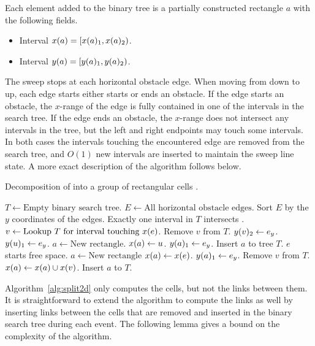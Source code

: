 \documentclass[english,gradu]{tktltiki2018}
\begin{document}
Each element added to the binary tree is a partially constructed rectangle $a$ with the following fields.
\begin{itemize}
\item Interval $x(a)=\left [ x(a)_{1} , x(a)_{2} \right )$.
\item Interval $y(a)=\left [ y(a)_{1} , y(a)_{2} \right )$.
\end{itemize}

The sweep stops at each horizontal obstacle edge.
When moving from down to up, each edge starts either starts or ends an obstacle.
If the edge starts an obstacle, the $x$-range of the edge is fully contained in one of the intervals in the search tree.
If the edge ends an obstacle, the $x$-range does not intersect any intervals in the tree, but the left and right endpoints may touch some intervals.
In both cases the intervals touching the encountered edge are removed from the search tree, and $O(1)$ new intervals are inserted to maintain the sweep line state.
A more exact description of the algorithm follows below.

\begin{alg}\label{alg:split2d}
Decomposition of \fspace into a group of rectangular cells .
\begin{algorithmic}
\State $T\gets \text{Empty binary search tree}$.
\State $E\gets\text{All horizontal obstacle edges}$.
\State Sort $E$ by the $y$ coordinates of the edges.
		\Comment Exactly one interval in $T$ intersects .
		\State $v\gets\text{Lookup $T$ for interval touching \ensuremath{x(e)}}$.
		\State Remove $v$ from $T$.
		\State $y(v)_{2}\gets{e}_y$.
			\State $y(u)_{1}\gets{e}_y$.
			\State $a\gets\text{New rectangle}$.
			\State $x(a)\gets u$.
			\State $y(a)_{1}\gets{e}_y$.
			\State Insert $a$ to tree $T$.
		\EndFor
	\Else\Comment $e$ starts free space.
		\State $a\gets\text{New rectangle}$
		\State $x(a)\gets x(e)$.
		\State $y(a)_{1}\gets{e}_y$.
			\State Remove $v$ from $T$.
			\State $x(a)\gets x(a)\cup x(v)$.
		\EndFor
		\State Insert $a$ to $T$.
	\EndIf
\EndFor
\end{algorithmic}
\end{alg}

Algorithm~\ref{alg:split2d} only computes the cells, but not the links between them.
It is straightforward to extend the algorithm to compute the links as well by inserting links between the cells that are removed and inserted in the binary search tree during each event.
The following lemma gives a bound on the complexity of the algorithm.
\end{document}
